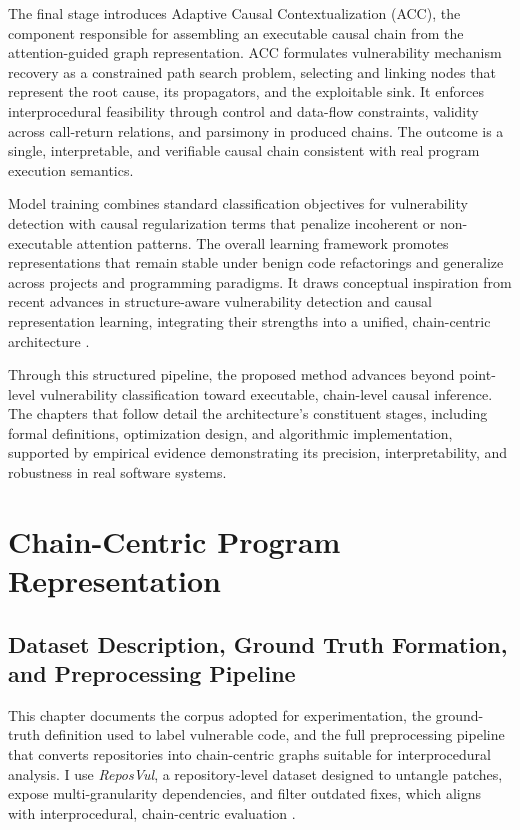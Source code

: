 \documentclass{buthesis}
\begin{document}
The final stage introduces Adaptive Causal Contextualization (ACC), the component responsible for assembling an executable causal chain from the attention-guided graph representation. ACC formulates vulnerability mechanism recovery as a constrained path search problem, selecting and linking nodes that represent the root cause, its propagators, and the exploitable sink. It enforces interprocedural feasibility through control and data-flow constraints, validity across call-return relations, and parsimony in produced chains. The outcome is a single, interpretable, and verifiable causal chain consistent with real program execution semantics.

Model training combines standard classification objectives for vulnerability detection with causal regularization terms that penalize incoherent or non-executable attention patterns. The overall learning framework promotes representations that remain stable under benign code refactorings and generalize across projects and programming paradigms. It draws conceptual inspiration from recent advances in structure-aware vulnerability detection and causal representation learning, integrating their strengths into a unified, chain-centric architecture \cite{Zhou2019,Li2022Empirical,Cao2024ASE,Chu2024ISSTA,hin2022linevd}. 

Through this structured pipeline, the proposed method advances beyond point-level vulnerability classification toward executable, chain-level causal inference. The chapters that follow detail the architecture’s constituent stages, including formal definitions, optimization design, and algorithmic implementation, supported by empirical evidence demonstrating its precision, interpretability, and robustness in real software systems.


\section{Chain-Centric Program Representation}
\label{sec:chain-conts}
\subsection{Dataset Description, Ground Truth Formation, and Preprocessing Pipeline}
\label{subsec:data-gt}

This chapter documents the corpus adopted for experimentation, the ground-truth definition used to label vulnerable code, and the full preprocessing pipeline that converts repositories into chain-centric graphs suitable for interprocedural analysis. I use \emph{ReposVul}, a repository-level dataset designed to untangle patches, expose multi-granularity dependencies, and filter outdated fixes, which aligns with interprocedural, chain-centric evaluation \cite{wang2024reposvul}.
\end{document}
